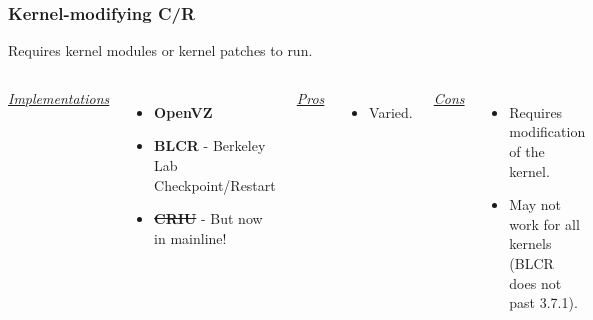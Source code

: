 \documentclass[compress]{beamer}
\begin{document}
\begin{frame}
\frametitle{Kernel-modifying C/R}

Requires kernel modules or kernel patches to run.

\begin{columns}[t]
\ul{\textit{Implementations}}
\begin{itemize}
\item \textbf{OpenVZ}
\item \textbf{BLCR} - Berkeley Lab Checkpoint/Restart 
\item \textbf{\st{CRIU}} - But now in mainline!
\end{itemize}

\ul{\textit{Pros}}
\begin{itemize}
\item Varied.
\end{itemize}

\ul{\textit{Cons}}
\begin{itemize}
\item Requires modification of the kernel.
\item May not work for all kernels (BLCR does not past 3.7.1).
\end{itemize}

\end{columns}

\end{frame}
  
\end{document}
